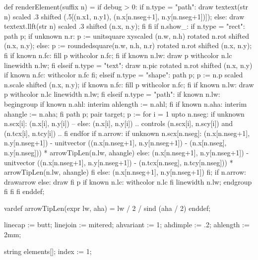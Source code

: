 def renderElement(suffix n) =
  if debug > 0:
    if n.type = "path":
      draw textext(str n) scaled .3 shifted (.5[(n.x1, n.y1), (n.x[n.nseg+1], n.y[n.nseg+1])]);
    else:
      draw textext.llft(str n) scaled .3 shifted (n.x, n.y);
    fi
  fi
  if n.show_:
    if n.type = "rect":
      path p;
      if unknown n.r:
        p := unitsquare xyscaled (n.w, n.h) rotated n.rot shifted (n.x, n.y);
      else:
        p := roundedsquare(n.w, n.h, n.r) rotated n.rot shifted (n.x, n.y);
      fi
      if known n.fc:
        fill p withcolor n.fc;
      fi
      if known n.lw:
        draw p withcolor n.lc linewidth n.lw;
      fi
    elseif n.type = "text":
      draw n.pic rotated n.rot shifted (n.x, n.y) if known n.fc: withcolor n.fc fi;
    elseif n.type = "shape":
      path p;
      p := n.p scaled n.scale shifted (n.x, n.y);
      if known n.fc:
        fill p withcolor n.fc;
      fi
      if known n.lw:
        draw p withcolor n.lc linewidth n.lw;
      fi
    elseif n.type = "path":
      if known n.lw:
        begingroup
          if known n.ahl:
            interim ahlength := n.ahl;
          fi
          if known n.aha:
            interim ahangle := n.aha;
          fi
          path p;
          pair target;
          p :=
            for i = 1 upto n.nseg:
              if unknown n.scx[i]:
                (n.x[i], n.y[i]) --
              else:
                (n.x[i], n.y[i]) .. controls (n.scx[i], n.scy[i]) and (n.tcx[i], n.tcy[i]) ..
              fi
            endfor
            if n.arrow:
              if unknown n.scx[n.nseg]:
                (n.x[n.nseg+1], n.y[n.nseg+1]) - unitvector ((n.x[n.nseg+1], n.y[n.nseg+1]) - (n.x[n.nseg], n.y[n.nseg])) * arrowTipLen(n.lw, ahangle)
              else:
                (n.x[n.nseg+1], n.y[n.nseg+1]) - unitvector ((n.x[n.nseg+1], n.y[n.nseg+1]) - (n.tcx[n.nseg], n.tcy[n.nseg])) * arrowTipLen(n.lw, ahangle)
              fi
            else:
              (n.x[n.nseg+1], n.y[n.nseg+1])
            fi;
          if n.arrow: drawarrow else: draw fi p if known n.lc: withcolor n.lc fi linewidth n.lw;
        endgroup
      fi
    fi
  fi
enddef;

vardef arrowTipLen(expr lw, aha) =
  lw / 2 / sind (aha / 2)
enddef;

\stopMPextensions

\startMPinitializations

linecap := butt;
linejoin := mitered;
ahvariant := 1;
ahdimple := .2;
ahlength := 2mm;

string elements[];
index := 1;

\stopMPinitializations